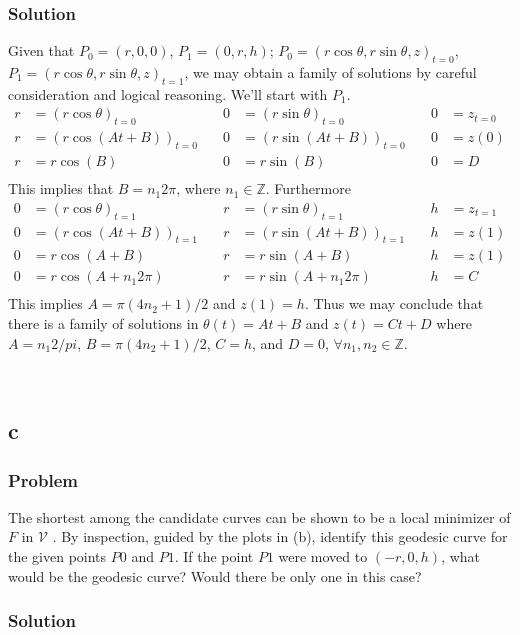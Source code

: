 \documentclass[12pt,twoside]{article}
\begin{document}
\subsubsection*{Solution}
Given that $P_0 = (r,0,0)$, $P_1=(0,r,h)$;
$P_0={(r\cos\theta,r\sin\theta,z)}_{t=0}$,
$P_1={(r\cos\theta,r\sin\theta,z)}_{t=1}$, we may obtain a family of solutions
by careful consideration and logical reasoning. We'll start with $P_1$.
\begin{equation*}
  \begin{aligned}
    r &= {(r\cos\theta)}_{t=0} &\quad 0 &= {(r\sin\theta)}_{t=0} &\quad 0 &=z_{t=0} \\
    r &= {(r\cos(At+B))}_{t=0} &\quad 0 &= {(r\sin(At+B))}_{t=0} &\quad 0 &=z(0) \\
    r &= r\cos(B) &\quad 0 &= r\sin(B) &\quad 0 &=D \\
  \end{aligned}
\end{equation*}
This implies that $B={n_1}2\pi$, where $n_1\in\mathbb{Z}$. Furthermore
\begin{equation*}
  \begin{aligned}
    0 &= {(r\cos\theta)}_{t=1} &\quad r &= {(r\sin\theta)}_{t=1} &\quad h &=z_{t=1} \\
    0 &= {(r\cos(At+B))}_{t=1} &\quad r &= {(r\sin(At+B))}_{t=1} &\quad h &=z(1) \\
    0 &= r\cos(A+B) &\quad r &= r\sin(A+B) &\quad h &=z(1) \\
    0 &= r\cos(A+{n_1}2\pi) &\quad r &= r\sin(A+{n_1}2\pi) &\quad h &=C \\
  \end{aligned}
\end{equation*}
This implies $A=\pi(4n_2+1)/2$ and $z(1)=h$. Thus we may conclude that there is a
family of solutions in $\theta(t)=At+B$ and $z(t)=Ct+D$ where $A={n_1}2/pi$,
$B=\pi(4n_2+1)/2$, $C=h$, and $D=0$, $\forall n_1,n_2\in\mathbb{Z}$.

\hfill\\
\noindent {}
\subsection{c}
\subsubsection*{Problem}
The shortest among the candidate curves can be shown to be a local minimizer of
$F$ in $\mathcal{V}$ . By inspection, guided by the plots in (b), identify this
geodesic curve for the given points $P0$ and $P1$. If the point $P1$ were moved
to $(−r,0,h)$, what would be the geodesic curve? Would there be only one in this
case?

\subsubsection*{Solution}
\todo{}
\end{document}
